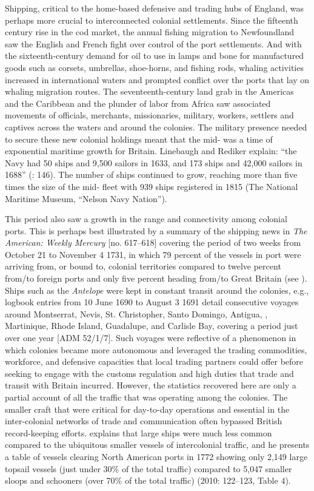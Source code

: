 Shipping, critical to the home-based defensive and trading hubs of England, was perhaps more crucial to interconnected colonial settlements. Since the fifteenth century rise in the cod market, the annual fishing migration to Newfoundland saw the English and French fight over control of the port settlements. And with the sixteenth-century demand for oil to use in lamps and bone for manufactured goods such as corsets, umbrellas, shoe-horns, and fishing rods, whaling activities increased in international waters and prompted conflict over the ports that lay on whaling migration routes. The seventeenth-century land grab in the Americas and the Caribbean and the plunder of labor from Africa saw associated movements of officials, merchants, missionaries, military, workers, settlers and captives across the waters and around the colonies. The military presence needed to secure these new colonial holdings meant that the mid- was a time of exponential maritime growth for Britain. Linebaugh and Rediker explain: “the Navy had 50 ships and 9,500 sailors in 1633, and 173 ships and 42,000 sailors in 1688” (\citealt{LinebaughRediker2000}: 146).  The number of ships continued to grow, reaching more than five times the size of the mid- fleet with 939 ships registered in 1815 (The National Maritime Museum, “Nelson Navy Nation”). 

This period also saw a growth in the range and connectivity among colonial ports. This is perhaps best illustrated by a summary of the shipping news in \textit{The American: Weekly Mercury} [no. 617–618] covering the period of two weeks from October 21 to November 4 1731, in which 79 percent of the vessels in port were arriving from, or bound to, colonial territories compared to twelve percent from/to foreign ports and only five percent heading from/to Great Britain (see ). Ships such as the \textit{Antelope} were kept in constant transit around the colonies, e.g., logbook entries from 10 June {1690} to August 3 1691 detail consecutive voyages around Montserrat, Nevis, St. Christopher, Santo Domingo, Antigua, , Martinique, Rhode Island, Guadalupe, and Carlisle Bay, covering a period just over one year [ADM 52/1/7]. Such voyages were reflective of a phenomenon in which colonies became more autonomous and leveraged the trading commodities, workforce, and defensive capacities that local trading partners could offer before seeking to engage with the customs regulation and high duties that trade and transit with Britain incurred. However, the statistics recovered here are only a partial account of all the traffic that was operating among the colonies. The smaller craft that were critical for day-to-day operations and essential in the inter-colonial networks of trade and communication often bypassed British record-keeping efforts. \citeauthor{Jarvis2010} explains that large ships were much less common compared to the ubiquitous smaller vessels of intercolonial traffic, and he presents a table of vessels clearing North American ports in 1772 showing only 2,149 large topsail vessels (just under 30\% of the total traffic) compared to 5,047 smaller sloops and schooners (over 70\% of the total traffic) (2010: 122–123, Table 4). 

